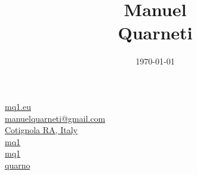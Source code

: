\documentclass{article}
\title{\vspace{-40pt} \HUGE \bfseries Manuel \\[-20pt] Quarneti \vspace{-40pt}}
\author{}
\date{\today}
\begin{document}
\begin{paracol}{3}

    \switchcolumn

    \maketitle

    \switchcolumn

    \begin{flushright}
        \href{https://mq1.eu/}{mq1.eu} \ \faGlobe \\
        \href{mailto:manuelquarneti@gmail.com}{manuelquarneti@gmail.com} \ \faEnvelope \\
        \href{https://www.openstreetmap.org/relation/43112}{Cotignola RA, Italy} \ \faCity \\
        \href{https://github.com/mq1}{mq1} \ \faGithub \\
        \href{https://www.linkedin.com/in/mq1}{mq1} \ \faLinkedin \\
        \href{https://t.me/quarno}{quarno} \ \faTelegram
    \end{flushright}
\end{paracol}
\end{document}
